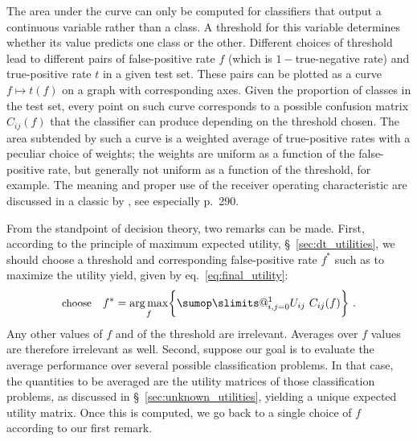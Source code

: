 \documentclass[\ifafour a4paper,12pt,\else a5paper,10pt,\fi%
onecolumn,oneside,article,%
british%
]{memoir}
\makeatletter
\theoremstyle{remark}
\theoremstyle{innote}
\def\sum{\DOTSI\sumop\slimits@}
\DeclarePairedDelimiter\set{\{}{\}} %
\renewcommand*{\|}[1][]{\nonscript\:#1\vert\nonscript\:\mathopen{}}
\newcommand*{\sect}{\S}%
\newcommand*{\eqn}{eq.}%
\DeclareMathOperator*{\argmax}{arg\,max}
\makeatother
\begin{document}
The area under the curve can only be computed for classifiers that output a continuous variable rather than a class. A threshold for this variable determines whether its value predicts one class or the other. Different choices of threshold lead to different pairs of false-positive rate $f$ (which is $1-{}$true-negative rate) and true-positive rate $t$ in a given test set. These pairs can be plotted as a curve $f \mapsto t(f)$ on a graph with corresponding axes. Given the proportion of classes in the test set, every point on such curve corresponds to a possible confusion matrix $C_{ij}(f)$ that the classifier can produce depending on the threshold chosen. The area subtended by such a curve is a weighted average of true-positive rates with a peculiar choice of weights; the weights are uniform as a function of the false-positive rate, but generally not uniform as a function of the threshold, for example. The meaning and proper use of the receiver operating characteristic are discussed in a classic by \cites{metz1978}, see especially p.~290.


\medskip

From the standpoint of decision theory, two remarks can be made\autocites[similar points are made by][]{bakeretal2001,loboetal2008}. First, according to the principle of maximum expected utility, \sect~\ref{sec:dt_utilities}, we should choose a threshold and corresponding false-positive rate $f^{*}$ such as to maximize the utility yield, given by \eqn~\eqref{eq:final_utility}:
\begin{equation}
  \label{eq:threshold_auc_maxutility}
  \text{\small choose}\quad
  f^{*} = \argmax_{f}\set[\bigg]{\sum_{i,j=0}^{1} U_{ij}\ C_{ij}(f)} \ .
\end{equation}
Any other values of $f$ and of the threshold are irrelevant. Averages over $f$ values are therefore irrelevant as well. Second, suppose our goal is to evaluate the average performance over several possible classification problems. In that case, the quantities to be averaged are the utility matrices of those classification problems, as discussed in \sect~\ref{sec:unknown_utilities}, yielding a unique expected utility matrix. Once this is computed, we go back to a single choice of $f$ according to our first remark.
\end{document}
